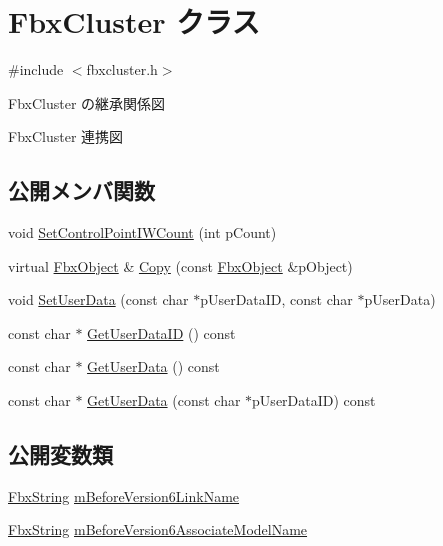 \hypertarget{class_fbx_cluster}{}\section{Fbx\+Cluster クラス}
\label{class_fbx_cluster}


{\ttfamily \#include $<$fbxcluster.\+h$>$}



Fbx\+Cluster の継承関係図


Fbx\+Cluster 連携図
\subsection*{公開メンバ関数}
\begin{DoxyCompactItemize}
\item 
void \hyperlink{class_fbx_cluster_a4772d095f168a919e12b03598219cf05}{Set\+Control\+Point\+I\+W\+Count} (int p\+Count)
\item 
virtual \hyperlink{class_fbx_object}{Fbx\+Object} \& \hyperlink{class_fbx_cluster_ac18a0581408958c73f56dd37790c40a9}{Copy} (const \hyperlink{class_fbx_object}{Fbx\+Object} \&p\+Object)
\item 
void \hyperlink{class_fbx_cluster_a8b2707b5d49a1e3e565884056df011f0}{Set\+User\+Data} (const char $\ast$p\+User\+Data\+ID, const char $\ast$p\+User\+Data)
\item 
const char $\ast$ \hyperlink{class_fbx_cluster_ad9b7d68a8bb3ad4141ff79cc1c01304d}{Get\+User\+Data\+ID} () const
\item 
const char $\ast$ \hyperlink{class_fbx_cluster_afd18bfe36ed5844ad6710629a68dc54f}{Get\+User\+Data} () const
\item 
const char $\ast$ \hyperlink{class_fbx_cluster_a5630b99cd6fadf8e839543f5471154d1}{Get\+User\+Data} (const char $\ast$p\+User\+Data\+ID) const
\end{DoxyCompactItemize}
\subsection*{公開変数類}
\begin{DoxyCompactItemize}
\item 
\hyperlink{class_fbx_string}{Fbx\+String} \hyperlink{class_fbx_cluster_ae78fd5670171a4d0ec2b8e86cc9dcd1b}{m\+Before\+Version6\+Link\+Name}
\item 
\hyperlink{class_fbx_string}{Fbx\+String} \hyperlink{class_fbx_cluster_a96b44a5dd28301425c0412b3cf4ea729}{m\+Before\+Version6\+Associate\+Model\+Name}
\end{DoxyCompactItemize}

